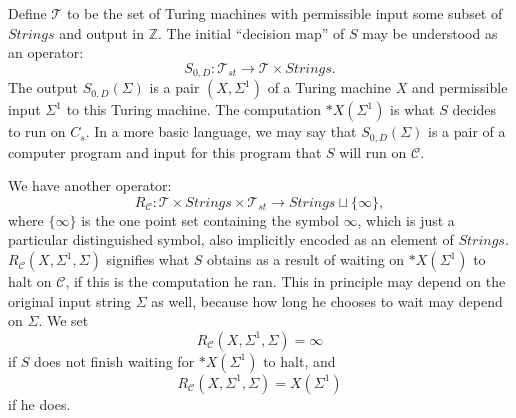 \documentclass[9pt,twocolumn,twoside,lineno]{pnas-new}
\numberwithin{equation}{section}
\theoremstyle{definition}
\theoremstyle{remark}
\begin{document}
Define $\mathcal{T}$ to be the set of Turing machines with permissible input some subset of $Strings$ and output in $\mathbb{Z}$. 
   The initial ``decision map'' of $S$ may be understood as an operator:
    $$S _{0,D}: \mathcal{T} _{st}   \to  {\mathcal{T}} \times {Strings}.$$ 
   The output  $S   _{0,D} (\Sigma)$ is a pair $(X, \Sigma ^{1}  )$ of a Turing machine $X $ and permissible input $\Sigma ^{1} $ to this Turing machine. The computation $*X  (\Sigma ^{1} ) $ is what $S$ decides to run on $C _{s} $. In a more basic language,  we may say that $S   _{0,D} (\Sigma)$ is a pair of a computer program and input for this program that $S$ will run on $\mathcal{C} $.

We have another operator:
\begin{equation*}
   R _{\mathcal{C}}: \mathcal{T} \times Strings \times \mathcal{T} _{st} \to Strings \sqcup \{\infty\},
\end{equation*}
where $\{\infty\}$ is the one point set containing the symbol $\infty$, which is just a particular distinguished symbol, also implicitly encoded as an element of $Strings$.
$R _{\mathcal{C}} (X, \Sigma ^{1}, \Sigma) $ signifies what $S$ obtains as a result of waiting on $*X (\Sigma ^{1} )$ to halt on $\mathcal{C}$, if this is the computation he ran.  This in principle may depend on the original input string $\Sigma$ as well, because how long he chooses to wait may depend on $\Sigma$.
We set $$R _{\mathcal{C}} (X, \Sigma ^{1}, \Sigma) = \infty$$  if $S$ does not finish waiting for $*X (\Sigma ^{1} )$ to halt, and $$R _{\mathcal{C}} (X, \Sigma ^{1}, \Sigma) = X (\Sigma ^{1} )$$ if he does.
\end{document}
